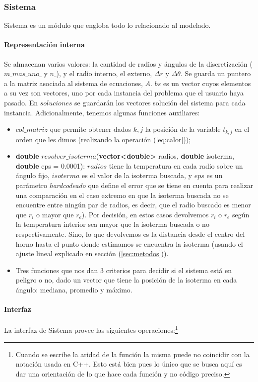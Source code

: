 \subsubsection{Sistema}
Sistema es un módulo que engloba todo lo relacionado al modelado.

\paragraph{Representación interna}
Se almacenan varios valores: la cantidad de radios y ángulos de la discretización ($m\_mas\_uno\_$ y $n\_$), y el radio interno, el externo, $\Delta r$ y $\Delta\theta$. Se guarda un puntero a la matriz asociada al sistema de ecuaciones, $A$. $bs$ es un vector cuyos elementos a su vez son vectores, uno por cada instancia del problema que el usuario haya pasado. En $soluciones$ se guardarán los vectores solución del sistema para cada instancia.
Adicionalmente, tenemos algunas funciones auxiliares: 

\begin{itemize}
	\item $col\_matriz$ que permite obtener dados $k,j$ la posición de la variable $t_{k,j}$ en el orden que les dimos (realizando la operación (\ref{eq:calor}));
	\item \textbf{double} $resolver\_isoterma$(\textbf{vector<double>} radios, \textbf{double} isoterma, \textbf{double} eps = 0.0001): $radios$ tiene la temperatura en cada radio sobre un ángulo fijo, $isoterma$ es el valor de la isoterma buscada, y $eps$ es un parámetro \textit{hardcodeado} que define el error que se tiene en cuenta para realizar una comparación en el caso extremo en que la isoterma buscada no se encuentre entre ningún par de radios, es decir, que el radio buscado es menor que $r_i$ o mayor que $r_e$). Por decisión, en estos casos devolvemos $r_i$ o $r_e$ según la temperatura interior sea mayor que la isoterma buscada o no respectivamente. Sino, lo que devolvemos es la distancia desde el centro del horno hasta el punto donde estimamos se encuentra la isoterma (usando el ajuste lineal explicado en sección (\ref{sec:metodos})).
	\item Tres funciones que nos dan 3 criterios para decidir si el sistema está en peligro o no, dado un vector que tiene la posición de la isoterma en cada ángulo: mediana, promedio y máximo. 
\end{itemize}

\paragraph{Interfaz}
La interfaz de Sistema provee las siguientes operaciones:\footnote{Cuando se escribe la aridad de la función la misma puede no coincidir con la notación usada en C++. Esto está bien pues lo único que se busca aquí es dar una orientación de lo que hace cada función y no código preciso.}


